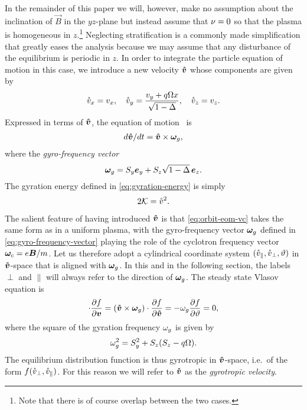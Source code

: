 \documentclass[aps,pre,notitlepage,amsmath,amssymb,amsfonts,nobibnotes,nofootinbib,superscriptaddress]{revtex4-1}
\begin{document}
In the remainder of this paper we will, however, make no assumption about the
inclination of $\vec{B}$ in the $yz$-plane but instead assume that $\nu=0$
so that the plasma is homogeneous in $z$.\footnote{Note that there is of
  course overlap between the two cases.} Neglecting stratification is a
commonly made simplification that greatly eases the analysis because we may
assume that any disturbance of the equilibrium is periodic in $z$. In order to
integrate the particle equation of motion in this case, we introduce a new
velocity $\bm{\mathring{v}}$ whose components are given by
\begin{equation}
  \label{eq:gyrotropic-velocity}
  \vc_x = v_x,\quad
  \vc_y = \frac{v_y + q\Omega x}{\sqrt{1-\Delta}},\quad
  \vc_z = v_z.
\end{equation}
Expressed in terms of $\bm{\mathring{v}}$, the equation of
motion~ is
\begin{align}
  \label{eq:orbit-eom-vc}
  d\vvc/dt = \vvc\times\vomg,
\end{align}
where the \emph{gyro-frequency vector}
\begin{equation}
  \label{eq:gyro-frequency-vector}
  \vomg = S_y\ey + S_z\sqrt{1-\Delta}\,\ez.
\end{equation}
The gyration energy defined in \cref{eq:gyration-energy} is simply
\begin{equation}
  \label{eq:gyration-energy-vc}
  2\mathcal{K} = \vc^2.
\end{equation}

The salient feature of having introduced $\bm{\mathring{v}}$ is that \cref{eq:orbit-eom-vc}
takes the same form as in a uniform plasma, with the gyro-frequency vector
$\bm{\omega}_g$ defined in \cref{eq:gyro-frequency-vector} playing the role of the
cyclotron frequency vector $\bm{\omega}_c=e\bm{B}/m$. Let us therefore adopt a
cylindrical coordinate system $(\mathring{v}_\parallel,\mathring{v}_\perp,\vartheta)$ in
$\bm{\mathring{v}}$-space that is aligned with $\bm{\omega}_g$. In this and in the following
section, the labels $\perp$ and $\parallel$ will always refer to the direction
of $\bm{\omega}_g$. The steady state Vlasov equation is
\begin{equation}
  [(\vec{v} + q\Omega x\ey)\times\vec{S}]\cdot\pder{f}{\vec{v}}
  = (\vvc\times\vomg)\cdot\pder{f}{\vvc} = -\omg\pder{f}{\vartheta} = 0,
\end{equation}
where the square of the gyration frequency $\omega_g$ is given by
\begin{equation}
  \label{eq:gyro-frequency}
  \omg^2 = S_y^2 + S_z(S_z - q\Omega).
\end{equation}
The equilibrium distribution function is thus gyrotropic in $\bm{\mathring{v}}$-space,
i.e.\ of the form $f(\mathring{v}_\perp,\mathring{v}_\parallel)$. For this reason we will refer
to $\bm{\mathring{v}}$ as the \emph{gyrotropic velocity}.
\end{document}
